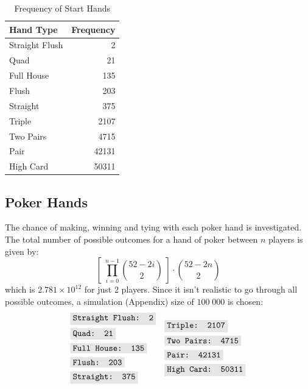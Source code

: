 \documentclass{article}
\newcommand{\code}[1]{\colorbox{codegray}{\texttt{#1}}}
\begin{document}
\begin{table}[ht]
    \centering
    \begin{tabular}{@{} lr @{}}
    \toprule
    \textbf{Hand Type} & \textbf{Frequency} \\
    \midrule
    Straight Flush & 2 \\
    Quad & 21 \\
    Full House & 135 \\
    Flush & 203 \\
    Straight & 375 \\
    Triple & 2107 \\
    Two Pairs & 4715 \\
    Pair & 42131 \\
    High Card & 50311 \\
    \bottomrule
    \end{tabular}
    \caption{Frequency of Start Hands}
\end{table}

\subsection*{Poker Hands}

The chance of making, winning and tying with each poker hand is 
investigated. The total number of possible outcomes for a hand 
of poker between $n$ players is given by:
\[
    \left[ \; \prod_{i = 0}^{n - 1} \binom{52 - 2i}{2} \; \right] \cdot \binom{52 - 2n}{2}
\]
which is $2.781 \times 10^{12}$ for just 2 players. 
Since it isn't realistic to go through all possible outcomes,
a simulation (Appendix) size of $100 \; 000$ is chosen:
\begin{align*}
    \begin{split}
        & \code{Straight Flush: 2} \\
        & \code{Quad: 21} \\
        & \code{Full House: 135} \\
        & \code{Flush: 203} \\
        & \code{Straight: 375} 
    \end{split}
    \quad
    \begin{split}
        & \code{Triple: 2107} \\
        & \code{Two Pairs: 4715} \\
        & \code{Pair: 42131} \\
        & \code{High Card: 50311} 
    \end{split}
\end{align*}
\end{document}
